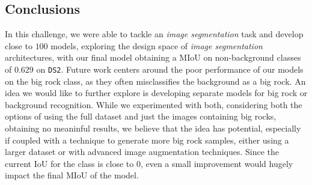 \documentclass[11pt]{article}
\begin{document}
\begin{multicols}{2}
      \section{Conclusions}
      \label{sec:conclusions}

      In this challenge, we were able to tackle an \textit{image segmentation} task and develop close to $100$ models, exploring the design space of \textit{image segmentation} architectures, with our final model obtaining a MIoU on non-background classes of $0.629$ on \texttt{DS2}. Future work centers around the poor performance of our models on the big rock class, as they often misclassifies the background as a big rock. An idea we would like to further explore is developing separate models for big rock or background recognition. While we experimented with both, considering both the options of using the full dataset and just the images containing big rocks, obtaining no meaninful results, we believe that the idea has potential, especially if coupled with a technique to generate more big rock samples, either using a larger dataset or with advanced image augmentation techniques. Since the current IoU for the class is close to 0, even a small improvement would hugely impact the final MIoU of the model.

      
      

\end{multicols}
\end{document}
